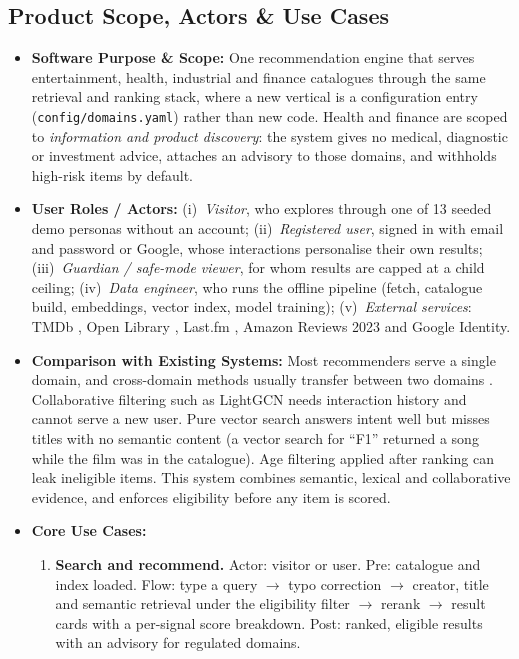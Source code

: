 \documentclass[11pt, a4paper]{article}
\begin{document}
\subsection{Product Scope, Actors \& Use Cases}
\begin{itemize}[noitemsep, topsep=2pt]
    \item \textbf{Software Purpose \& Scope:} One recommendation engine that serves entertainment, health, industrial and finance catalogues through the same retrieval and ranking stack, where a new vertical is a configuration entry (\texttt{config/domains.yaml}) rather than new code. Health and finance are scoped to \emph{information and product discovery}: the system gives no medical, diagnostic or investment advice, attaches an advisory to those domains, and withholds high-risk items by default.
    \item \textbf{User Roles / Actors:} (i)~\emph{Visitor}, who explores through one of 13 seeded demo personas without an account; (ii)~\emph{Registered user}, signed in with email and password or Google, whose interactions personalise their own results; (iii)~\emph{Guardian / safe-mode viewer}, for whom results are capped at a child ceiling; (iv)~\emph{Data engineer}, who runs the offline pipeline (fetch, catalogue build, embeddings, vector index, model training); (v)~\emph{External services}: TMDb \cite{tmdb}, Open Library \cite{openlibrary}, Last.fm \cite{lastfm}, Amazon Reviews 2023 \cite{hou2024amazon} and Google Identity.
    \item \textbf{Comparison with Existing Systems:} Most recommenders serve a single domain, and cross-domain methods usually transfer between two domains \cite{zang2022cross,zhang2025survey}. Collaborative filtering such as LightGCN \cite{he2020lightgcn} needs interaction history and cannot serve a new user. Pure vector search answers intent well but misses titles with no semantic content (a vector search for ``F1'' returned a song while the film was in the catalogue). Age filtering applied after ranking can leak ineligible items. This system combines semantic, lexical and collaborative evidence, and enforces eligibility before any item is scored.
    \item \textbf{Core Use Cases:}
    \begin{enumerate}[noitemsep, topsep=2pt]
        \item \textbf{Search and recommend.} Actor: visitor or user. Pre: catalogue and index loaded. Flow: type a query $\rightarrow$ typo correction $\rightarrow$ creator, title and semantic retrieval under the eligibility filter $\rightarrow$ rerank $\rightarrow$ result cards with a per-signal score breakdown. Post: ranked, eligible results with an advisory for regulated domains.

\end{enumerate}
\end{itemize}
\end{document}
